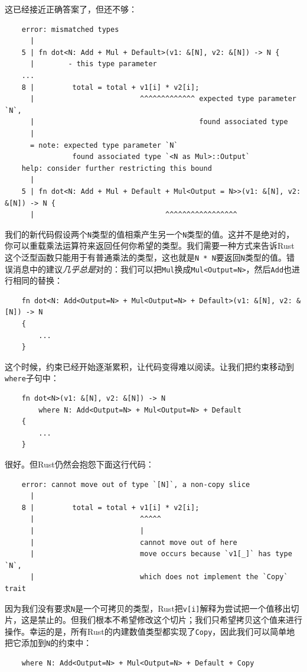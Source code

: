 这已经接近正确答案了，但还不够：
\begin{verbatim}
    error: mismatched types
      |
    5 | fn dot<N: Add + Mul + Default>(v1: &[N], v2: &[N]) -> N {
      |        - this type parameter
    ...
    8 |         total = total + v1[i] * v2[i];
      |                         ^^^^^^^^^^^^^ expected type parameter `N`,
      |                                       found associated type
      |
      = note: expected type parameter `N`
                found associated type `<N as Mul>::Output`
    help: consider further restricting this bound
      |
    5 | fn dot<N: Add + Mul + Default + Mul<Output = N>>(v1: &[N], v2: &[N]) -> N {
      |                               ^^^^^^^^^^^^^^^^^
\end{verbatim}

我们的新代码假设两个\texttt{N}类型的值相乘产生另一个\texttt{N}类型的值。这并不是绝对的，你可以重载乘法运算符来返回任何你希望的类型。我们需要一种方式来告诉Rust这个泛型函数只能用于有普通乘法的类型，这也就是\texttt{N * N}要返回\texttt{N}类型的值。错误消息中的建议\emph{几乎总是}对的：我们可以把\texttt{Mul}换成\texttt{Mul<Output=N>}，然后\texttt{Add}也进行相同的替换：
\begin{verbatim}
    fn dot<N: Add<Output=N> + Mul<Output=N> + Default>(v1: &[N], v2: &[N]) -> N
    {
        ...
    }
\end{verbatim}

这个时候，约束已经开始逐渐累积，让代码变得难以阅读。让我们把约束移动到\texttt{where}子句中：
\begin{verbatim}
    fn dot<N>(v1: &[N], v2: &[N]) -> N
        where N: Add<Output=N> + Mul<Output=N> + Default
    {
        ...
    }
\end{verbatim}

很好。但Rust仍然会抱怨下面这行代码：
\begin{verbatim}
    error: cannot move out of type `[N]`, a non-copy slice
      |
    8 |         total = total + v1[i] * v2[i];
      |                         ^^^^^
      |                         |
      |                         cannot move out of here
      |                         move occurs because `v1[_]` has type `N`,
      |                         which does not implement the `Copy` trait
\end{verbatim}

因为我们没有要求\texttt{N}是一个可拷贝的类型，Rust把\texttt{v[i]}解释为尝试把一个值移出切片，这是禁止的。但我们根本不希望修改这个切片；我们只希望拷贝这个值来进行操作。幸运的是，所有Rust的内建数值类型都实现了\texttt{Copy}，因此我们可以简单地把它添加到\texttt{N}的约束中：
\begin{verbatim}
    where N: Add<Output=N> + Mul<Output=N> + Default + Copy
\end{verbatim}

